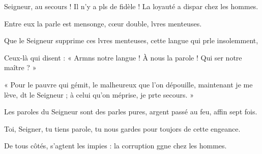 \item Seigneur, au secours ! Il n’y a pls de fidèle !\psstar{} La loyauté a dispar chez les hommes.
\item Entre eux la parle est mensonge,\psstar{} cœur double, lvres menteuses.
\item Que le Seigneur supprime ces lvres menteuses,\psstar{} cette langue qui prle insolemment,
\item Ceux-là qui disent : « Armns notre langue !\psstar{} À nous la parole ! Qui ser notre maître ? »
\item « Pour le pauvre qui gémit, le malheureux que l’on dépouille,\pscross{} maintenant je me lève, dt le Seigneur ;\psstar{} à celui qu’on méprise, je prte secours. »
\item Les paroles du Seigneur sont des parles pures,\psstar{} argent passé au feu, affin sept fois.
\item Toi, Seigner, tu tiens parole,\psstar{} tu nous gardes pour toujors de cette engeance.
\item De tous côtés, s’agtent les impies :\psstar{} la corruption ggne chez les hommes.